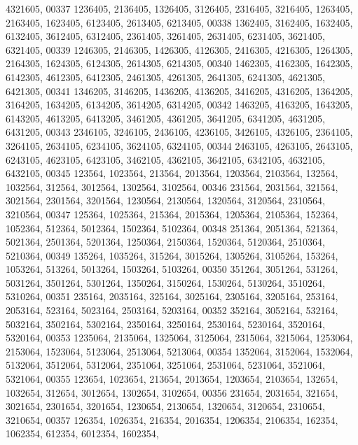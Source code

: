 \begin{DoxyCode}
      4321605,
00337       1236405, 2136405, 1326405, 3126405, 2316405, 3216405, 1263405, 2163405, 1623405, 6123405, 2613405, 
      6213405,
00338       1362405, 3162405, 1632405, 6132405, 3612405, 6312405, 2361405, 3261405, 2631405, 6231405, 3621405, 
      6321405,
00339       1246305, 2146305, 1426305, 4126305, 2416305, 4216305, 1264305, 2164305, 1624305, 6124305, 2614305, 
      6214305,
00340       1462305, 4162305, 1642305, 6142305, 4612305, 6412305, 2461305, 4261305, 2641305, 6241305, 4621305, 
      6421305,
00341       1346205, 3146205, 1436205, 4136205, 3416205, 4316205, 1364205, 3164205, 1634205, 6134205, 3614205, 
      6314205,
00342       1463205, 4163205, 1643205, 6143205, 4613205, 6413205, 3461205, 4361205, 3641205, 6341205, 4631205, 
      6431205,
00343       2346105, 3246105, 2436105, 4236105, 3426105, 4326105, 2364105, 3264105, 2634105, 6234105, 3624105, 
      6324105,
00344       2463105, 4263105, 2643105, 6243105, 4623105, 6423105, 3462105, 4362105, 3642105, 6342105, 4632105, 
      6432105,
00345        123564, 1023564,  213564, 2013564, 1203564, 2103564,  132564, 1032564,  312564, 3012564, 1302564, 
      3102564,
00346        231564, 2031564,  321564, 3021564, 2301564, 3201564, 1230564, 2130564, 1320564, 3120564, 2310564, 
      3210564,
00347        125364, 1025364,  215364, 2015364, 1205364, 2105364,  152364, 1052364,  512364, 5012364, 1502364, 
      5102364,
00348        251364, 2051364,  521364, 5021364, 2501364, 5201364, 1250364, 2150364, 1520364, 5120364, 2510364, 
      5210364,
00349        135264, 1035264,  315264, 3015264, 1305264, 3105264,  153264, 1053264,  513264, 5013264, 1503264, 
      5103264,
00350        351264, 3051264,  531264, 5031264, 3501264, 5301264, 1350264, 3150264, 1530264, 5130264, 3510264, 
      5310264,
00351        235164, 2035164,  325164, 3025164, 2305164, 3205164,  253164, 2053164,  523164, 5023164, 2503164, 
      5203164,
00352        352164, 3052164,  532164, 5032164, 3502164, 5302164, 2350164, 3250164, 2530164, 5230164, 3520164, 
      5320164,
00353       1235064, 2135064, 1325064, 3125064, 2315064, 3215064, 1253064, 2153064, 1523064, 5123064, 2513064, 
      5213064,
00354       1352064, 3152064, 1532064, 5132064, 3512064, 5312064, 2351064, 3251064, 2531064, 5231064, 3521064, 
      5321064,
00355        123654, 1023654,  213654, 2013654, 1203654, 2103654,  132654, 1032654,  312654, 3012654, 1302654, 
      3102654,
00356        231654, 2031654,  321654, 3021654, 2301654, 3201654, 1230654, 2130654, 1320654, 3120654, 2310654, 
      3210654,
00357        126354, 1026354,  216354, 2016354, 1206354, 2106354,  162354, 1062354,  612354, 6012354, 1602354, 

\end{DoxyCode}
